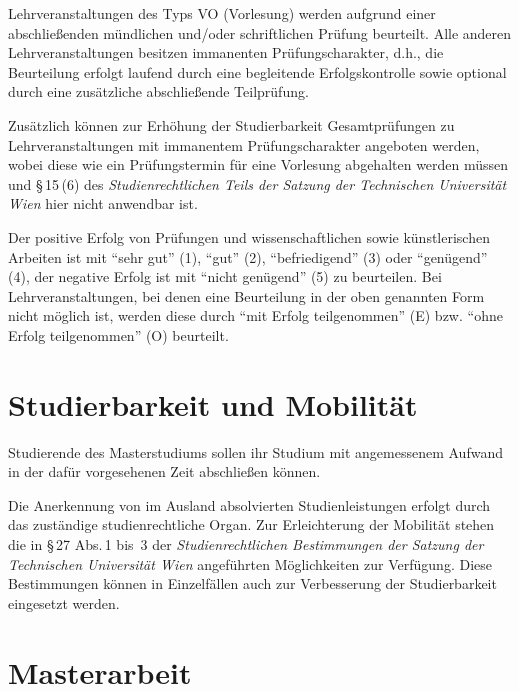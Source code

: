 Lehrveranstaltungen des Typs VO (Vorlesung) werden aufgrund einer
abschließenden mündlichen und/oder schriftlichen Prüfung
beurteilt. Alle anderen Lehrveranstaltungen besitzen immanenten
Prüfungscharakter, d.h., die Beurteilung erfolgt laufend durch eine
begleitende Erfolgskontrolle sowie optional durch eine zusätzliche
abschließende Teilprüfung.

Zusätzlich können zur Erhöhung der Studierbarkeit Gesamtprüfungen zu
Lehrveranstaltungen mit immanentem Prüfungscharakter angeboten werden,
wobei diese wie ein Prüfungstermin für eine Vorlesung abgehalten
werden müssen und \S\,15\,(6) des \emph{Studienrechtlichen Teils der 
Satzung der Technischen Universität Wien} hier nicht anwendbar ist.

Der positive Erfolg von Prüfungen und wissenschaftlichen sowie 
künstlerischen Arbeiten ist mit "`sehr gut"' (1), "`gut"'
(2), "`befriedigend"' (3) oder "`genügend"' (4), der negative Erfolg
ist mit "`nicht genügend"' (5) zu beurteilen. Bei Lehrveranstaltungen, 
bei denen eine Beurteilung in der oben genannten Form nicht möglich ist, 
werden diese durch "`mit Erfolg teilgenommen"' (E) bzw. 
"`ohne Erfolg teilgenommen"' (O) beurteilt.

%

\section{Studierbarkeit und Mobilität}\label{sec:SM}

Studierende des Masterstudiums \emph{} sollen ihr
Studium mit angemessenem Aufwand in der dafür vorgesehenen Zeit
abschließen können.


Die Anerkennung von im Ausland absolvierten Studienleistungen erfolgt
durch das zuständige studienrechtliche Organ.  Zur Erleichterung der
Mobilität stehen die in \S\,27 Abs.\,1 bis~3 der
\emph{Studienrechtlichen Bestimmungen der Satzung der Technischen
  Universität Wien} angeführten Möglichkeiten zur Verfügung. Diese
Bestimmungen können in Einzelfällen auch zur Verbesserung der
Studierbarkeit eingesetzt werden.
%

%


\section{Masterarbeit}\label{sec:DA}

